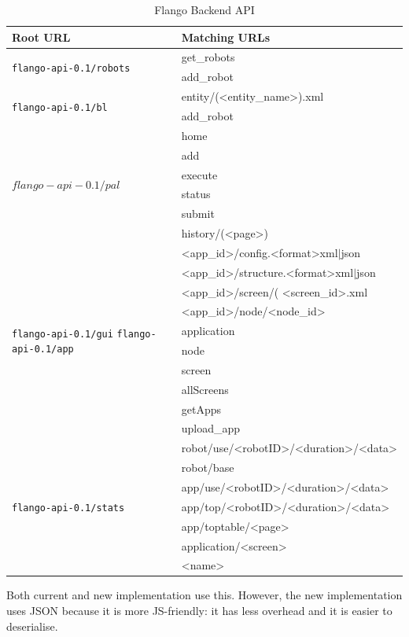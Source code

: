 \begin{table}[ht]
    \centering
    \label{tab:milestones}
    \begin{tabularx}{\linewidth}{| l | X |}
    \hline
    Root URL & Matching URLs \\
    \hline
    \multirow{2}{*}{\texttt{flango-api-0.1/robots}}
        & get\_robots \\ 
        & add\_robot \\
    \hline 
    
    \multirow{2}{*}{\texttt{flango-api-0.1/bl}} 
        & entity/(\textless entity\_name\textgreater).xml \\ 
        & add\_robot \\
    \hline
    
    \multirow{6}{*}{$flango-api-0.1/pal$} 
        & home \\
        & add \\
        & execute \\
        & status \\   
        & submit \\
        & history/(\textless page\textgreater) \\
    \hline
    
    \multirow{10}{2.5cm}{\texttt{flango-api-0.1/gui}  \texttt{flango-api-0.1/app}}
        & \textless app\_id\textgreater /config.\textless format\textgreater xml$|$json \\
        & \textless app\_id\textgreater /structure.\textless format\textgreater xml$|$json \\
        & \textless app\_id\textgreater /screen/( \textless screen\_id\textgreater.xml \\
        & \textless app\_id\textgreater /node/\textless node\_id\textgreater \\
        & application \\
        & node \\
        & screen \\
        & allScreens \\
        & getApps \\
        & upload\_app \\
    \hline
    
    \multirow{7}{*}{\texttt{flango-api-0.1/stats}}
        & robot/use/<robotID>/<duration>/<data> \\
        & robot/base \\
        & app/use/<robotID>/<duration>/<data> \\
        & app/top/<robotID>/<duration>/<data> \\
        & app/toptable/<page> \\
        & application/<screen> \\
        & <name> \\
    \hline
    \end{tabularx}
    \caption{Flango Backend API}
\end{table}
Both current and new implementation use this.
However, the new implementation uses \ac{JSON} because it is more \ac{JS}-friendly: it has less overhead and it is easier to deserialise.

